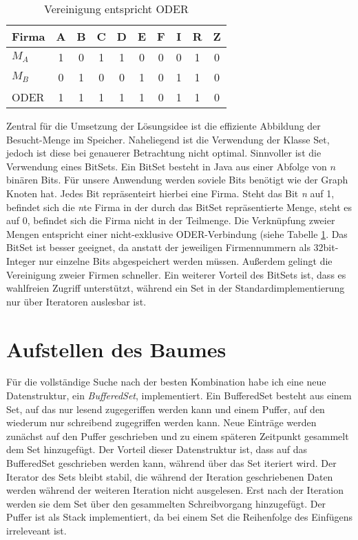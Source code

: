 \begin{table}
	\centering
    \begin{tabular}{l|ccccccccc}
    Firma 	& A & B & C & D & E & F & I & R & Z \\ \hline
    \(M_A\)	& 1 & 0 & 1 & 1 & 0 & 0 & 0 & 1 & 0 \\
    \(M_B\)	& 0 & 1 & 0 & 0 & 1 & 0 & 1 & 1 & 0 \\ \hhline{=|*{9}{=}}
    ODER 	& 1 & 1 & 1 & 1 & 1 & 0 & 1 & 1 & 0 \\
    \end{tabular}
    \caption {Vereinigung entspricht ODER}
    \label{tab:veroder}
\end{table}
Zentral für die Umsetzung der Lösungsidee ist die effiziente Abbildung der Besucht-Menge im Speicher. Naheliegend ist die Verwendung der Klasse Set, jedoch ist diese bei genauerer Betrachtung nicht optimal. Sinnvoller ist die Verwendung eines BitSets. Ein BitSet besteht in Java aus einer Abfolge von \(n\) binären Bits. Für unsere Anwendung werden soviele Bits benötigt wie der Graph Knoten hat. Jedes Bit repräsenteirt hierbei eine Firma. Steht das Bit \textit{n} auf 1, befindet sich die \textit{n}te Firma in der durch das BitSet repräsentierte Menge, steht es auf 0, befindet sich die Firma nicht in der Teilmenge. Die Verknüpfung zweier Mengen entspricht einer nicht-exklusive ODER-Verbindung (siehe Tabelle \ref{tab:veroder}. Das BitSet ist besser geeignet, da anstatt der jeweiligen Firmennummern als 32bit-Integer nur einzelne Bits abgespeichert werden müssen. Außerdem gelingt die Vereinigung zweier Firmen schneller. Ein weiterer Vorteil des BitSets ist, dass es wahlfreien Zugriff unterstützt, während ein Set in der Standardimplementierung nur über Iteratoren auslesbar ist.

\section{Aufstellen des Baumes}
Für die vollständige Suche nach der besten Kombination habe ich eine neue Datenstruktur, ein \textit{BufferedSet}, implementiert. Ein BufferedSet besteht aus einem Set, auf das nur lesend zugegeriffen werden kann und einem Puffer, auf den wiederum nur schreibend zugegriffen werden kann. Neue Einträge werden zunächst auf den Puffer geschrieben und zu einem späteren Zeitpunkt gesammelt dem Set hinzugefügt. Der Vorteil dieser Datenstruktur ist, dass auf das BufferedSet geschrieben werden kann, während über das Set iteriert wird. Der Iterator des Sets bleibt stabil, die während der Iteration geschriebenen Daten werden während der weiteren Iteration nicht ausgelesen. Erst nach der Iteration werden sie dem Set über den gesammelten Schreibvorgang hinzugefügt. Der Puffer ist als Stack implementiert, da bei einem Set die Reihenfolge des Einfügens irreleveant ist.

